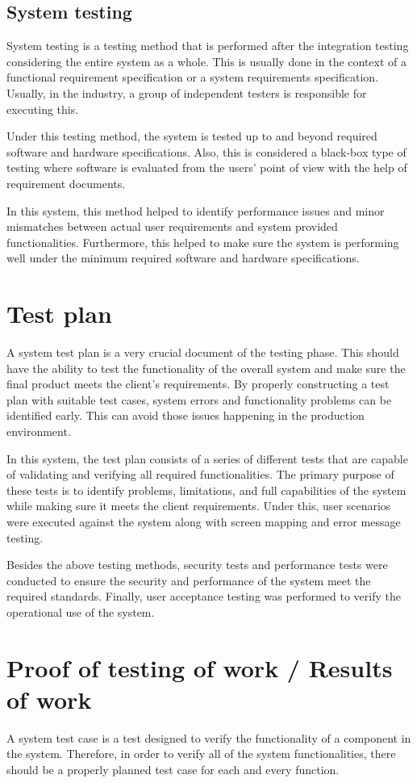 \documentclass[12pt]{report}
\begin{document}
\subsection{System testing}
System testing is a testing method that is performed after the integration testing considering the entire system as a whole. This is usually done in the context of a functional requirement specification or a system requirements specification. Usually, in the industry, a group of independent testers is responsible for executing this.

Under this testing method, the system is tested up to and beyond required software and hardware specifications. Also, this is considered a black-box type of testing where software is evaluated from the users' point of view with the help of requirement documents.

In this system, this method helped to identify performance issues and minor mismatches between actual user requirements and system provided functionalities. Furthermore, this helped to make sure the system is performing well under the minimum required software and hardware specifications.

\section{Test plan}
A system test plan is a very crucial document of the testing phase. This should have the ability to test the functionality of the overall system and make sure the final product meets the client's requirements. By properly constructing a test plan with suitable test cases, system errors and functionality problems can be identified early. This can avoid those issues happening in the production environment.

In this system, the test plan consists of a series of different tests that are capable of validating and verifying all required functionalities. The primary purpose of these tests is to identify problems, limitations, and full capabilities of the system while making sure it meets the client requirements. Under this, user scenarios were executed against the system along with screen mapping and error message testing.

Besides the above testing methods, security tests and performance tests were conducted to ensure the security and performance of the system meet the required standards. Finally, user acceptance testing was performed to verify the operational use of the system.

\section{Proof of testing of work / Results of work}
A system test case is a test designed to verify the functionality of a component in the system. Therefore, in order to verify all of the system functionalities, there should be a properly planned test case for each and every function.
\end{document}
